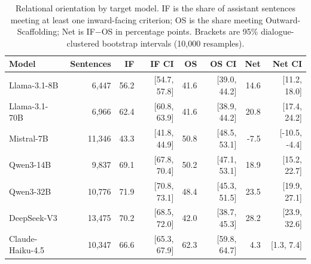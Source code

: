 \begin{table}[t]
\centering
\small
\caption{Relational orientation by target model. IF is the share of assistant sentences meeting at least one inward-facing criterion; OS is the share meeting Outward-Scaffolding; Net is IF$-$OS in percentage points. Brackets are 95\% dialogue-clustered bootstrap intervals (10,000 resamples).}
\label{tab:model_orientation}
\begin{tabular}{lrrrrrrr}
\toprule
Model & Sentences & IF & IF CI & OS & OS CI & Net & Net CI \\
\midrule
Llama-3.1-8B & 6,447 & 56.2 & [54.7, 57.8] & 41.6 & [39.0, 44.2] & 14.6 & [11.2, 18.0] \\
Llama-3.1-70B & 6,966 & 62.4 & [60.8, 63.9] & 41.6 & [38.9, 44.2] & 20.8 & [17.4, 24.2] \\
Mistral-7B & 11,346 & 43.3 & [41.8, 44.9] & 50.8 & [48.5, 53.1] & -7.5 & [-10.5, -4.4] \\
Qwen3-14B & 9,837 & 69.1 & [67.8, 70.4] & 50.2 & [47.1, 53.1] & 18.9 & [15.2, 22.7] \\
Qwen3-32B & 10,776 & 71.9 & [70.8, 73.1] & 48.4 & [45.3, 51.5] & 23.5 & [19.9, 27.1] \\
DeepSeek-V3 & 13,475 & 70.2 & [68.5, 72.0] & 42.0 & [38.7, 45.3] & 28.2 & [23.9, 32.6] \\
Claude-Haiku-4.5 & 10,347 & 66.6 & [65.3, 67.9] & 62.3 & [59.8, 64.7] & 4.3 & [1.3, 7.4] \\
\bottomrule
\end{tabular}
\end{table}

